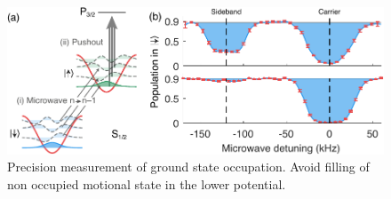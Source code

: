\documentclass[aps,pra,reprint,a4paper,nofootinbib,superscriptaddress,numbers,longbibliography,showpacs,showkeys,floatfix]{revtex4-1}
\begin{document}
%
\begin{figure}
	\centering
	\includegraphics[width=\textwidth]{figure2}
	\caption[]{Precision measurement of ground state occupation. Avoid filling of non occupied motional state in the lower potential.}
	\label{Fig:BelmechriTechnique}
\end{figure}
\end{document}
